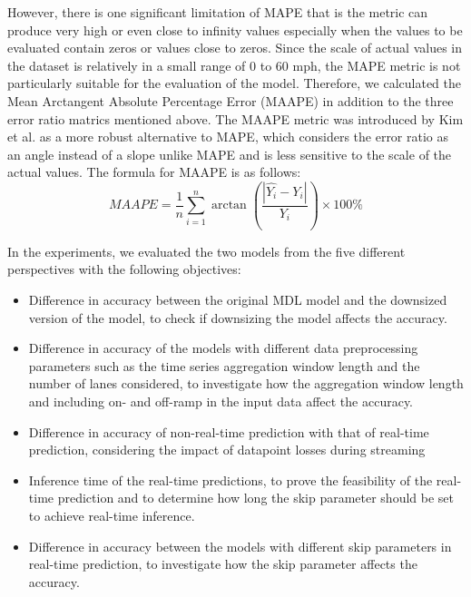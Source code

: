 \documentclass[11pt]{uonthesis}
\begin{document}
However, there is one significant limitation of MAPE that is the metric can produce very high or even close to infinity values especially when the values to be evaluated contain zeros or values close to zeros. Since the scale of actual values in the dataset is relatively in a small range of 0 to 60 mph, the MAPE metric is not particularly suitable for the evaluation of the model. Therefore, we calculated the Mean Arctangent Absolute Percentage Error (MAAPE) in addition to the three error ratio matrics mentioned above. The MAAPE metric was introduced by Kim et al. \cite{KIM2016669} as a more robust alternative to MAPE, which considers the error ratio as an angle instead of a slope unlike MAPE and is less sensitive to the scale of the actual values. The formula for MAAPE is as follows:
\[ MAAPE = \frac{1}{n}\sum_{i=1}^{n} \arctan\left(\frac{|\hat{Y_i} - Y_i|}{Y_i}\right) \times 100\% \]


In the experiments, we evaluated the two models from the five different perspectives with the following objectives:
\begin{itemize}
    \item Difference in accuracy between the original MDL model and the downsized version of the model, to check if downsizing the model affects the accuracy.
    \item Difference in accuracy of the models with different data preprocessing parameters such as the time series aggregation window length and the number of lanes considered, to investigate how the aggregation window length and including on- and off-ramp in the input data affect the accuracy.
    \item Difference in accuracy of non-real-time prediction with that of real-time prediction, considering the impact of datapoint losses during streaming
    \item Inference time of the real-time predictions, to prove the feasibility of the real-time prediction and to determine how long the skip parameter should be set to achieve real-time inference.
    \item Difference in accuracy between the models with different skip parameters in real-time prediction, to investigate how the skip parameter affects the accuracy.
\end{itemize}
\end{document}
